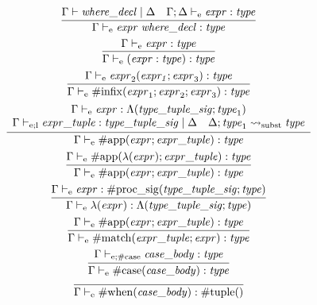\begin{gather*}
    \infer{\Gamma \vdash_\mathrm{e} \mathit{expr}\; \mathit{where\_decl}: \mathit{type}}{
        \Gamma \vdash \mathit{where\_decl} \mid \Delta
        &
        \Gamma; \Delta \vdash_\mathrm{e} \mathit{expr}: \mathit{type}
    }
    \\
    \infer{\Gamma \vdash_\mathrm{e} (\mathit{expr}: \mathit{type}): \mathit{type}}{
        \Gamma \vdash_\mathrm{e} \mathit{expr}: \mathit{type}
    }
    \\
    \infer{\Gamma \vdash_\mathrm{e} \mathrm{\#infix}(\mathit{expr}_1; \mathit{expr}_2; \mathit{expr}_3): \mathit{type}}{
        \Gamma \vdash_\mathrm{e} \mathit{expr}_2(\mathit{expr_1}; \mathit{expr}_3): \mathit{type}
    }
    \\
    \infer{\Gamma \vdash_\mathrm{e} \mathrm{\#app}(\mathit{expr}; \mathit{expr\_tuple}): \mathit{type}}{
        \begin{array}{c}
            \Gamma \vdash_\mathrm{e} \mathit{expr}: \Lambda(\mathit{type\_tuple\_sig}; \mathit{type}_1)
            \\
            \Gamma \vdash_{\mathrm{e}; \mathrm{l}} \mathit{expr\_tuple}: \mathit{type\_tuple\_sig} \mid \Delta
            \hspace{1em}
            \Delta; \mathit{type}_1 \rightsquigarrow_\mathrm{subst} \mathit{type}
        \end{array}
    }
    \\
    \infer{\Gamma \vdash_\mathrm{e} \mathrm{\#app}(\mathit{expr}; \mathit{expr\_tuple}): \mathit{type}}{
        \Gamma \vdash_\mathrm{e} \mathrm{\#app}(\lambda(\mathit{expr}); \mathit{expr\_tuple}): \mathit{type}
    }
    \\
    \infer{\Gamma \vdash_\mathrm{e} \lambda(\mathit{expr}): \Lambda(\mathit{type\_tuple\_sig}; \mathit{type})}{
        \Gamma \vdash_\mathrm{e} \mathit{expr}: \mathrm{\#proc\_sig}(\mathit{type\_tuple\_sig}; \mathit{type})
    }
    \\
    \infer{\Gamma \vdash_\mathrm{e} \mathrm{\#match}(\mathit{expr\_tuple}; \mathit{expr}): \mathit{type}}{
        \Gamma \vdash_\mathrm{e} \mathrm{\#app}(\mathit{expr}; \mathit{expr\_tuple}): \mathit{type}
    }
    \\
    \infer{\Gamma \vdash_\mathrm{e} \mathrm{\#case}(\mathit{case\_body}): \mathit{type}}{
        \Gamma \vdash_{\mathrm{e}; \mathrm{\#case}} \mathit{case\_body}: \mathit{type}
    }
    \\
    \infer{\Gamma \vdash_\mathrm{e} \mathrm{\#when}(\mathit{case\_body}): \mathrm{\#tuple}()}{
}
\end{gather*}
